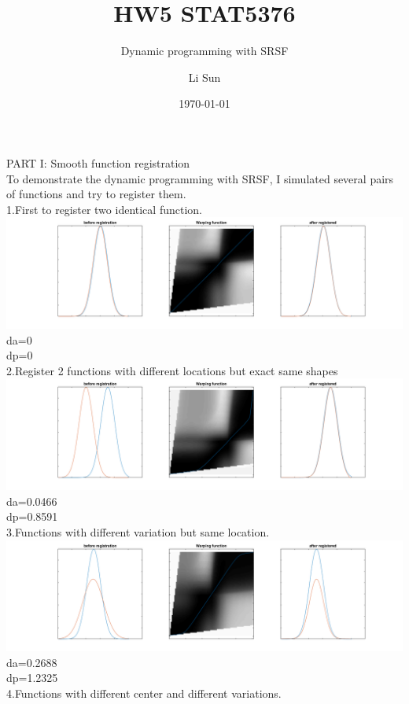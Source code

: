 \documentclass[11pt]{scrartcl}
\begin{document}
\title{HW5 STAT5376}
\subtitle{Dynamic programming with SRSF}
\author{Li Sun}
\date{\today}
\maketitle

\noindent
PART I: Smooth function registration\\
To demonstrate the dynamic programming with SRSF, I simulated several pairs of functions and try to register them.\\
1.First to register two identical function.\\
\includegraphics[scale=0.4]{hw51.png}\\
da=0\\
dp=0\\
2.Register 2 functions with different locations but exact same shapes\\
\includegraphics[scale=0.4]{hw52.png}\\
da=0.0466\\
dp=0.8591\\
3.Functions with different variation but same location.\\
\includegraphics[scale=0.4]{hw53.png}\\
da=0.2688\\
dp=1.2325\\
4.Functions with different center and different variations.\\
\end{document}
